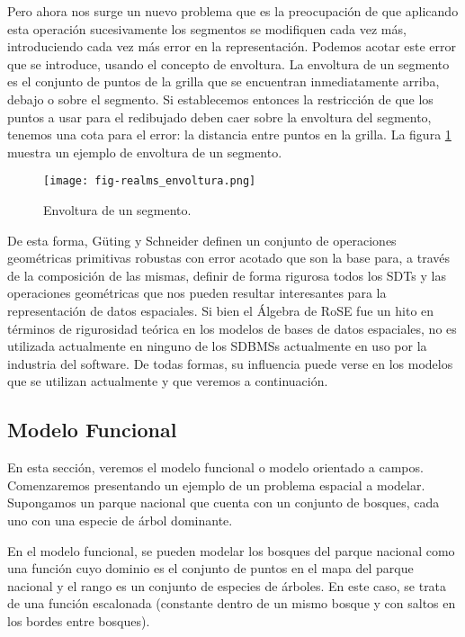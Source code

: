 Pero ahora nos surge un nuevo problema que es la preocupación de que aplicando esta operación sucesivamente
los segmentos se modifiquen cada vez más, introduciendo cada vez más error en la representación.
Podemos acotar este error que se introduce, usando el concepto de envoltura.
La envoltura de un segmento es el conjunto de puntos de la grilla que se encuentran inmediatamente arriba, debajo o sobre el segmento.
Si establecemos entonces la restricción de que los puntos a usar para el redibujado deben caer sobre la envoltura del segmento,
tenemos una cota para el error: la distancia entre puntos en la grilla.
La figura \ref{fig:realms:envoltura} muestra un ejemplo de envoltura de un segmento.

\begin{figure}
    \centering
    \texttt{[image: fig-realms\_envoltura.png]}
    \caption{Envoltura de un segmento.}
    \label{fig:realms:envoltura}
\end{figure}

De esta forma, Güting y Schneider definen un conjunto de operaciones geométricas primitivas robustas con error acotado que son la base para,
a través de la composición de las mismas, definir de forma rigurosa todos los SDTs
y las operaciones geométricas que nos pueden resultar interesantes para la representación de datos espaciales.
Si bien el Álgebra de RoSE fue un hito en términos de rigurosidad teórica en los modelos de bases de datos espaciales,
no es utilizada actualmente en ninguno de los SDBMSs actualmente en uso por la industria del software.
De todas formas, su influencia puede verse en los modelos que se utilizan actualmente y que veremos a continuación.

\subsection{Modelo Funcional} \label{sec:s:fun}

En esta sección, veremos el modelo funcional o modelo orientado a campos.
Comenzaremos presentando un ejemplo de un problema espacial a modelar. Supongamos un parque nacional que cuenta con
un conjunto de bosques, cada uno con una especie de árbol dominante.

En el modelo funcional, se pueden modelar los bosques del parque nacional como
una función cuyo dominio es el conjunto de puntos en el mapa del parque nacional y el rango es un conjunto de especies de árboles.
En este caso, se trata de una función escalonada (constante dentro de un mismo bosque y con saltos en los bordes entre bosques).


